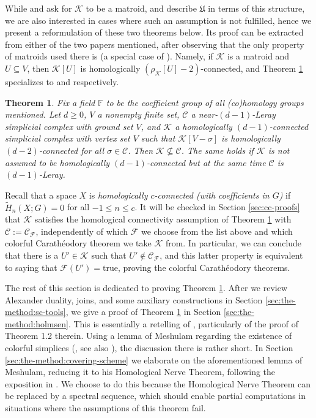 \documentclass[a4paper,11pt,reqno, english]{amsart}
\newtheorem{theorem}{Theorem}[section]
\theoremstyle{definition}
\theoremstyle{remark}
\begin{document}
While \cite[Theorem 1.6]{KalaiMeshulam2005} and \cite[Theorem 1.4]{Holmsen2016} ask for $\mathscr{K}$ to be a matroid, and describe $\mathfrak{U}$ in terms of this structure, we are also interested in cases where such an assumption is not fulfilled, hence we present a reformulation of these two theorems below. Its proof can be extracted from either of the two papers mentioned, after observing that the only property of matroids used there is \cite[Lemma 3.2]{Holmsen2016} (a special case of \cite[Proposition 6.2]{Bjorner1995}). Namely, if $\mathscr{K}$ is a matroid and $U\subseteq V$, then $\mathscr{K}[U]$ is homologically $(\rho_\mathscr{K}[U]-2)$-connected, and Theorem \ref{thm:holmsen-repackaged} specializes to \cite[Theorem 1.6]{KalaiMeshulam2005} and \cite[Theorem 1.4]{Holmsen2016} respectively.
\begin{theorem}\label{thm:holmsen-repackaged}
    Fix a field $\mathbb{F}$ to be the coefficient group of all (co)homology groups mentioned. Let $d\geq 0$, $V$ a nonempty finite set, $\mathscr{C}$ a near-$(d-1)$-Leray simplicial complex with ground set $V$, and $\mathscr{K}$ a homologically $(d-1)$-connected simplicial complex with vertex set $V$ such that $\mathscr{K}[V-\sigma]$ is homologically $(d-2)$-connected for all $\sigma\in\mathscr{C}$. Then $\mathscr{K}\nsubseteq\mathscr{C}$.
    The same holds if $\mathscr{K}$ is not assumed to be homologically $(d-1)$-connected but at the same time $\mathscr{C}$ is $(d-1)$-Leray.
\end{theorem}
Recall that a space $X$ is \emph{homologically $c$-connected (with coefficients in $G$)} if $\tilde{H}_n(X;G)=0$ for all $-1\leq n\leq c$. It will be checked in Section \ref{sec:cc-proofs} that $\mathscr{K}$ satisfies the homological connectivity assumption of Theorem \ref{thm:holmsen-repackaged} with $\mathscr{C}:=\mathscr{C}_{\mathcal{F}}$, independently of which $\mathcal{F}$ we choose from the list above and which colorful Carath\'eodory theorem we take $\mathscr{K}$ from. In particular, we can conclude that there is a $U'\in\mathscr{K}$ such that $U'\notin\mathscr{C}_{\mathcal{F}}$, and this latter property is equivalent to saying that $\mathcal{F}(U')=\mathrm{true}$, proving the colorful Carath\'eodory theorems.

The rest of this section is dedicated to proving Theorem \ref{thm:holmsen-repackaged}. After we review Alexander duality, joins, and some auxiliary constructions in Section \ref{sec:the-method:sc-tools}, we give a proof of Theorem \ref{thm:holmsen-repackaged} in Section \ref{sec:the-method:holmsen}. This is essentially a retelling of \cite{Holmsen2016}, particularly of the proof of Theorem 1.2 therein. Using a lemma of Meshulam regarding the existence of colorful simplices (\cite[Proposition 1.6]{Meshulam2003}, see also \cite[Proposition 3.1]{KalaiMeshulam2005}), the discussion there is rather short. In Section \ref{sec:the-method:covering-scheme} we elaborate on the aforementioned lemma of Meshulam, reducing it to his Homological Nerve Theorem, following the exposition in \cite[Proposition 3.1]{KalaiMeshulam2005}. We choose to do this because the Homological Nerve Theorem can be replaced by a spectral sequence, which should enable partial computations in situations where the assumptions of this theorem fail.
\end{document}
